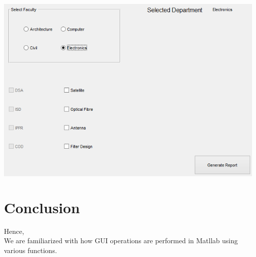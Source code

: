 \documentclass[12pt]{article}
\begin{document}
\includegraphics[scale = 0.6]{output_labfour_2.png}
\pagebreak
\section{Conclusion}
Hence, \\
We are familiarized with how GUI operations are performed in Matllab using various functions.
\newpage
%
%
\end{document}
